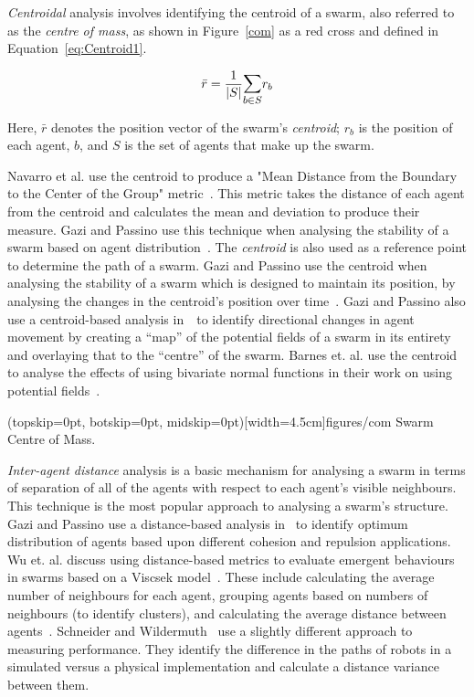 \documentclass{ieeeaccess}
\newcommand{\card}[1]{\vert{#1}\vert}
\begin{document}
\textit{Centroidal} analysis involves identifying the centroid of a swarm, also
referred to as the \textit{centre of mass}, as shown in Figure~\ref{com} as a
red cross and defined in Equation~\ref{eq:Centroid1}. 

\begin{equation}\label{eq:Centroid1}
  \bar{r} = \frac{1}{\card{S}}\mathlarger{\sum_{b \in S}} r_b
\end{equation}

Here, $\bar{r}$ denotes the position vector of the swarm's \textit{centroid};
$r_b$ is the position of each agent, $b$, and $S$ is the set of agents that make
up the swarm.

Navarro et al. use the centroid to produce a "Mean Distance from the Boundary
to the Center of the Group" metric~\cite{NIM:09}. This metric takes the
distance of each agent from the centroid and calculates the mean and deviation
to produce their measure. Gazi and Passino use this technique when analysing
the stability of a swarm based on agent distribution~\cite{GP:11}. The
\textit{centroid} is also used as a reference point to determine the path of a
swarm. Gazi and Passino use the centroid when analysing the stability of a
swarm which is designed to maintain its position, by analysing the changes in
the centroid's position over time~\cite{GP:04}. Gazi and Passino also use a
centroid-based analysis in~\cite{GP:02}~to identify directional changes in
agent movement by creating a ``map'' of the potential fields of a swarm in its
entirety and overlaying that to the ``centre'' of the swarm.  Barnes et. al.
use the centroid to analyse the effects of using bivariate normal functions in
their work on using potential fields~\cite{BAF:06, BAFVM:06}. 

\Figure[t!](topskip=0pt, botskip=0pt, midskip=0pt)[width=4.5cm]{figures/com}
{Swarm Centre of Mass.\label{com}}

\textit{Inter-agent distance} analysis is a basic mechanism for analysing a
swarm in terms of separation of all of the agents with respect to each agent's
visible neighbours.  
This technique is the most popular approach to
analysing a swarm's structure. Gazi and Passino use a distance-based analysis
in~\cite{GP:04, GP:11} to identify optimum distribution of agents based upon
different cohesion and repulsion applications. Wu et. al. discuss using
distance-based metrics to evaluate emergent behaviours in swarms based on a
Viscsek model~\cite{WCW:11}. These include calculating the average number of
neighbours for each agent, grouping agents based on numbers of neighbours (to
identify clusters), and calculating the average distance between agents~\cite{WCW:11}.
Schneider and Wildermuth~\cite{SW:03} use a slightly different approach to
measuring performance. They identify the difference in the paths of robots in a
simulated versus a physical implementation and calculate a distance variance
between them.
\end{document}
